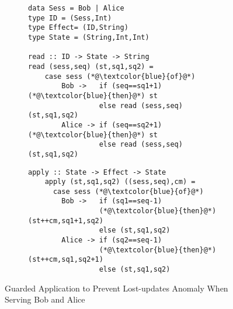 \begin{figure}[h]
	\centering
	\begin{subfigure}[t]{0.5\textwidth}
	\begin{lstlisting}
data Sess = Bob | Alice
type ID = (Sess,Int) 
type Effect= (ID,String)
type State = (String,Int,Int)
	
read :: ID -> State -> String
read (sess,seq) (st,sq1,sq2) = 
	case sess (*@\textcolor{blue}{of}@*) 
		Bob ->   if (seq==sq1+1) (*@\textcolor{blue}{then}@*) st
		         else read (sess,seq)(st,sq1,sq2)
		Alice -> if (seq==sq2+1) (*@\textcolor{blue}{then}@*) st
		         else read (sess,seq)(st,sq1,sq2)
	\end{lstlisting}		  
	\end{subfigure}
	\hfill
	\begin{subfigure}[t]{0.42\textwidth}
	\begin{lstlisting}[firstnumber=13]
	apply :: State -> Effect -> State 
	apply (st,sq1,sq2) ((sess,seq),cm) = 
	  case sess (*@\textcolor{blue}{of}@*) 
	    Bob ->   if (sq1==seq-1)
	             (*@\textcolor{blue}{then}@*) (st++cm,sq1+1,sq2)
	             else (st,sq1,sq2)
	    Alice -> if (sq2==seq-1)
	             (*@\textcolor{blue}{then}@*) (st++cm,sq1,sq2+1)
	             else (st,sq1,sq2)
	\end{lstlisting}		  
        \end{subfigure}

	\hrulefill
	\caption{Guarded Application to Prevent Lost-updates Anomaly
	When Serving Bob and Alice}
	\label{fig:modified_code}
\end{figure}


